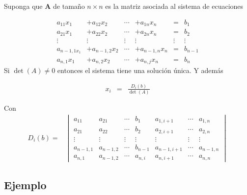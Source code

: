 \documentclass[
]{article}
\begin{document}
Suponga que \(\mathbf{A}\) de tamaño \(n\times n\) es la matriz asociada
al sistema de ecuaciones

\begin{equation}
\begin{array}{cccccc}
     a_{11}x_{1}        & +a_{12}x_{2}    & \cdots  &+ a_{1n}x_{n}    & =       & b_1       \\ 
     a_{21}x_{1}        & +a_{22}x_{2}    & \cdots  &+ a_{2n}x_{n}    & =       & b_2       \\
    \vdots              & \vdots          & \vdots  & \vdots          & \vdots  &  \vdots      \\
     a_{n-1,1x_{1}}     & +a_{n-1,2}x_{2} & \cdots  &+ a_{n-1,n}x_{n} & =       & b_{n-1}      \\
     a_{n,1}x_{1}       & +a_{n,2}x_{2}   & \cdots  &+ a_{n,j}x_n     & =       & b_{n}
\end{array}
\end{equation} Si \(\det(A)\ne 0\) entonces el sistema tiene una
solución única. Y además

\begin{equation}\label{eq:Cramer}
\begin{array}{ccc}
x_i &=& \frac{D_i(b)}{\det(A)}
\end{array}
\end{equation}

Con \begin{equation}
\begin{array}{ccc}
D_{i}(b) = &  \begin{vmatrix} 
                  a_{11}     & a_{21}    & \cdots   & b_{1}      &  a_{1,i+1} &\cdots    & a_{1,n}      \\ 
                  a_{21}     & a_{22}    & \cdots   & b_{2}      & a_{2,i+1}  &\cdots    & a_{2,n}      \\
                  \vdots     & \vdots    & \vdots   &  \vdots    & \vdots     &\vdots    &  \vdots      \\
                  a_{n-1,1}  & a_{n-1,2} & \cdots   & b_{n-1}    & a_{n-1,i+1}&\cdots    & a_{n-1,n}    \\
                  a_{n,1}    &  a_{n-1,2}& \cdots   & a_{n,i}    & a_{n,i+1}  &\cdots    & a_{n,n}
  \end{vmatrix} 
\end{array}
\end{equation}

\hypertarget{ejemplo-5}{%
\subsection{Ejemplo}\label{ejemplo-5}}
\end{document}
